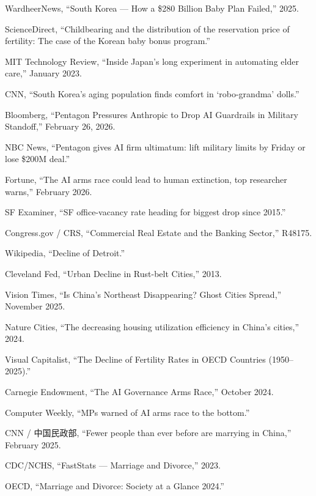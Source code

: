 \documentclass[11pt,a4paper]{ctexart}
\begin{document}
\noindent [8] WardheerNews, ``South Korea --- How a \$280 Billion Baby Plan Failed,'' 2025.

\noindent [9] ScienceDirect, ``Childbearing and the distribution of the reservation price of fertility: The case of the Korean baby bonus program.''

\noindent [10] MIT Technology Review, ``Inside Japan's long experiment in automating elder care,'' January 2023.

\noindent [11] CNN, ``South Korea's aging population finds comfort in `robo-grandma' dolls.''

\noindent [12] Bloomberg, ``Pentagon Pressures Anthropic to Drop AI Guardrails in Military Standoff,'' February 26, 2026.

\noindent [13] NBC News, ``Pentagon gives AI firm ultimatum: lift military limits by Friday or lose \$200M deal.''

\noindent [14] Fortune, ``The AI arms race could lead to human extinction, top researcher warns,'' February 2026.

\noindent [15] SF Examiner, ``SF office-vacancy rate heading for biggest drop since 2015.''

\noindent [16] Congress.gov / CRS, ``Commercial Real Estate and the Banking Sector,'' R48175.

\noindent [17] Wikipedia, ``Decline of Detroit.''

\noindent [18] Cleveland Fed, ``Urban Decline in Rust-belt Cities,'' 2013.

\noindent [19] Vision Times, ``Is China's Northeast Disappearing? Ghost Cities Spread,'' November 2025.

\noindent [20] Nature Cities, ``The decreasing housing utilization efficiency in China's cities,'' 2024.

\noindent [21] Visual Capitalist, ``The Decline of Fertility Rates in OECD Countries (1950--2025).''

\noindent [22] Carnegie Endowment, ``The AI Governance Arms Race,'' October 2024.

\noindent [23] Computer Weekly, ``MPs warned of AI arms race to the bottom.''

\noindent [24] CNN / 中国民政部, ``Fewer people than ever before are marrying in China,'' February 2025.

\noindent [25] CDC/NCHS, ``FastStats --- Marriage and Divorce,'' 2023.

\noindent [26] OECD, ``Marriage and Divorce: Society at a Glance 2024.''
\end{document}
